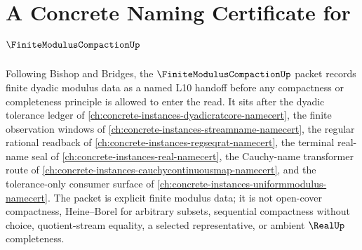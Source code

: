 \chapter{A Concrete Naming Certificate for $\FiniteModulusCompactionUp$}
\label{ch:concrete-instances-finite-modulus-compaction-namecert}

Following Bishop and Bridges, the $\FiniteModulusCompactionUp$ packet records finite dyadic modulus data as a named L10 handoff before any compactness or completeness principle is allowed to enter the read. It sits after the dyadic tolerance ledger of \autoref{ch:concrete-instances-dyadicratcore-namecert}, the finite observation windows of \autoref{ch:concrete-instances-streamname-namecert}, the regular rational readback of \autoref{ch:concrete-instances-regseqrat-namecert}, the terminal real-name seal of \autoref{ch:concrete-instances-real-namecert}, the Cauchy-name transformer route of \autoref{ch:concrete-instances-cauchycontinuousmap-namecert}, and the tolerance-only consumer surface of \autoref{ch:concrete-instances-uniformmodulus-namecert}. The packet is explicit finite modulus data; it is not open-cover compactness, Heine--Borel for arbitrary subsets, sequential compactness without choice, quotient-stream equality, a selected representative, or ambient $\RealUp$ completeness.

